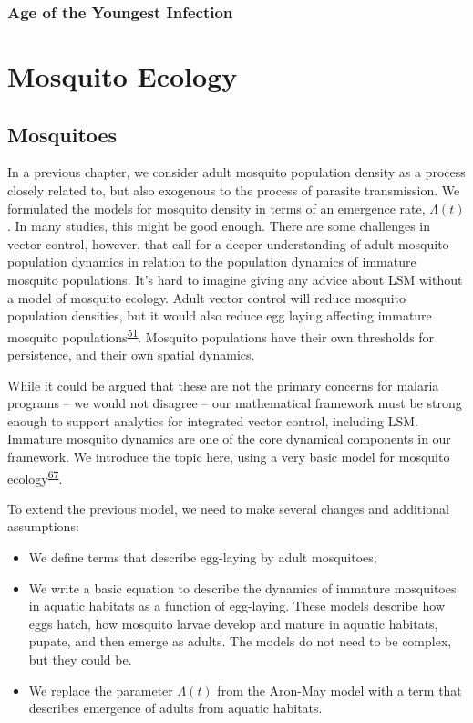 \documentclass[
]{book}
\begin{document}
\hypertarget{age-of-the-youngest-infection}{%
\section{Age of the Youngest Infection}\label{age-of-the-youngest-infection}}

\hypertarget{part-mosquito-ecology}{%
\part{Mosquito Ecology}\label{part-mosquito-ecology}}

\hypertarget{mosquitoes}{%
\chapter{Mosquitoes}\label{mosquitoes}}

In a previous chapter, we consider adult mosquito population density as a process closely related to, but also exogenous to the process of parasite transmission. We formulated the models for mosquito density in terms of an emergence rate, \(\Lambda(t)\). In many studies, this might be good enough. There are some challenges in vector control, however, that call for a deeper understanding of adult mosquito population dynamics in relation to the population dynamics of immature mosquito populations. It's hard to imagine giving any advice about LSM without a model of mosquito ecology. Adult vector control will reduce mosquito population densities, but it would also reduce egg laying affecting immature mosquito populations\textsuperscript{\protect\hyperlink{ref-BradyOJ2015AdultVector}{51}}. Mosquito populations have their own thresholds for persistence, and their own spatial dynamics.

While it could be argued that these are not the primary concerns for malaria programs -- we would not disagree -- our mathematical framework must be strong enough to support analytics for integrated vector control, including LSM. Immature mosquito dynamics are one of the core dynamical components in our framework. We introduce the topic here, using a very basic model for mosquito ecology\textsuperscript{\protect\hyperlink{ref-SmithDL2013_LarvalDynamics}{67}}.

To extend the previous model, we need to make several changes and additional assumptions:

\begin{itemize}
\item
  We define terms that describe egg-laying by adult mosquitoes;
\item
  We write a basic equation to describe the dynamics of immature mosquitoes in aquatic habitats as a function of egg-laying. These models describe how eggs hatch, how mosquito larvae develop and mature in aquatic habitats, pupate, and then emerge as adults. The models do not need to be complex, but they could be.
\item
  We replace the parameter \(\Lambda(t)\) from the Aron-May model with a term that
  describes emergence of adults from aquatic habitats.
\end{itemize}
\end{document}
